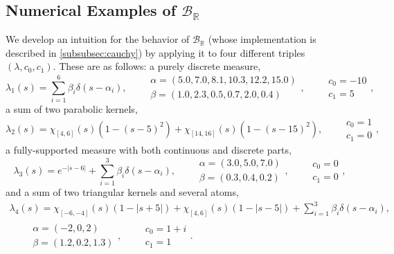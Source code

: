 \documentclass{cams-l} %
\newcommand{\dave}[1]{#1}\newcommand{\davebegin}{}\newcommand{\daveend}{}\newcommand{\george}[1]{#1}
\newcommand{\RR}{\mathbb R}
\newcommand{\cB}{\mathcal B}
\theoremstyle{definition}
\theoremstyle{remark}
\numberwithin{equation}{section}
\begin{document}
\subsection{Numerical Examples of \texorpdfstring{$\cB_\RR$}{BR}}%
We develop an intuition for the behavior of $\cB_\RR$ \dave{(whose implementation is described in \cref{subsubsec:cauchy}) by applying it to four different triples $(\lambda,c_0,c_1)$}. These are as follows: a purely discrete measure,
\begin{equation*}
    \lambda_1(s) = \sum_{i=1}^6\beta_i\delta(s-\alpha_i), \qquad \begin{array}{l}\alpha = (5.0, 7.0, 8.1, 10.3, 12.2, 15.0)\\\beta = (1.0, 2.3, 0.5, 0.7, 2.0, 0.4)\end{array},\qquad \begin{array}{l}c_0 = -10\\c_1 = 5\end{array},
\end{equation*}
a sum of two parabolic kernels,
\begin{equation*}
    \lambda_2(s) = \chi_{[4, 6]}(s)(1 - (s-5)^2) + \chi_{[14, 16]}(s)(1 - (s-15)^2), \qquad \begin{array}{l}c_0 = 1\\c_1 = 0\end{array},
\end{equation*}
a fully-supported measure with both continuous and discrete parts,
\begin{equation*}
    \lambda_3(s) = e^{-|s-6|} + \sum_{i=1}^3\beta_i\delta(s-\alpha_i), \qquad \begin{array}{l}\alpha = (3.0, 5.0, 7.0)\\\beta = (0.3, 0.4, 0.2)\end{array},\qquad \begin{array}{l}c_0 = 0\\c_1 = 0\end{array},
\end{equation*}
and a sum of two triangular kernels and several atoms,
\begin{equation*}
\begin{gathered}
    \lambda_4(s) = \chi_{[-6, -4]}(s)(1 - |s+5|) + \chi_{[4, 6]}(s)(1 - |s-5|)+ \sum_{i=1}^3\beta_i\delta(s-\alpha_i),\\
    \qquad \begin{array}{l}\alpha = (-2, 0, 2)\\\beta = (1.2, 0.2, 1.3)\end{array},\qquad \begin{array}{l}c_0 = 1+i\\c_1 = 1\end{array}.
\end{gathered}
\end{equation*}
\end{document}
